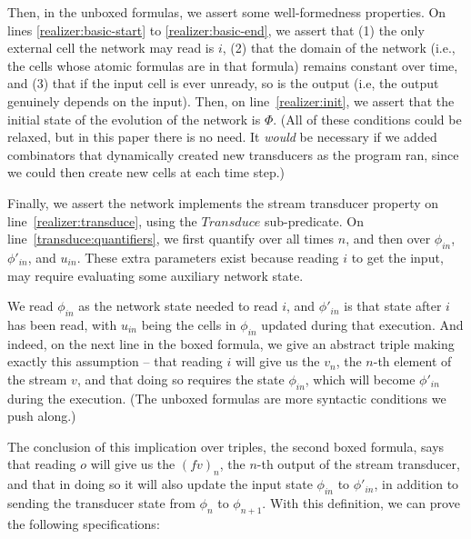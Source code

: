 \documentclass[preprint,natbib]{sigplanconf}
\begin{document}
Then, in the unboxed formulas, we assert some well-formedness
properties. On lines \ref{realizer:basic-start} to
\ref{realizer:basic-end}, we assert that (1) the only external cell
the network may read is $i$, (2) that the domain of the network (i.e.,
the cells whose atomic formulas are in that formula) remains constant
over time, and (3) that if the input cell is ever unready, so is the
output (i.e, the output genuinely depends on the input). Then, on
line~\ref{realizer:init}, we assert that the initial state of the
evolution of the network is $\Phi$.  (All of these conditions could be
relaxed, but in this paper there is no need. It \emph{would}
be necessary if we added combinators that dynamically created new
transducers as the program ran, since we could then create new cells
at each time step.)

Finally, we assert the network implements the stream transducer 
property on line~\ref{realizer:transduce}, using the $\mathit{Transduce}$
sub-predicate. On line~\ref{transduce:quantifiers}, we first quantify
over all times $n$, and then over $\phi_{in}$, $\phi'_{in}$, and
$u_{in}$. These extra parameters exist because reading $i$ to get the
input, may require evaluating some auxiliary network state. 

We read $\phi_{in}$ as the network state needed to read $i$, and $\phi'_{in}$ is
that state after $i$ has been read, with $u_{in}$ being the cells in
$\phi_{in}$ updated during that execution.  And indeed, on the next line
in the boxed formula, we give an abstract triple making exactly this
assumption -- that reading $i$ will give us the $v_n$, the $n$-th
element of the stream $v$, and that doing so requires the state
$\phi_{in}$, which will become $\phi'_{in}$ during the execution. (The
unboxed formulas are more syntactic conditions we push along.)

The conclusion of this implication over triples, the second
boxed formula, says that reading $o$ will give us the $(f v)_n$, the
$n$-th output of the stream transducer, and that in doing so it will 
also update the input state $\phi_{in}$ to $\phi'_{in}$, in addition to 
sending the transducer state from $\phi_n$ to $\phi_{n+1}$. 
With this definition, we can prove the following specifications: 
\end{document}
